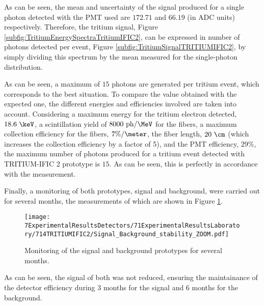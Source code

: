 As can be seen, the mean and uncertainty of the signal produced for a single photon detected with the PMT used are $172.71$ and $66.19$ (in ADC units) respectively. Therefore, the tritium signal, Figure \ref{subfig:TritiumEnergySpectraTritiumIFIC2}, can be expressed in number of photons detected per event, Figure \ref{subfig:TritiumSignalTRITIUMIFIC2}, by simply dividing this spectrum by the mean measured for the single-photon distribution.


As can be seen, a maximum of $15$ photons are generated per tritium event, which corresponds to the best situation. To compare the value obtained with the expected one, the different energies and efficiencies involved are taken into account. Considering a maximum energy for the tritium electron detected, $18.6~\keV$, a scintillation yield of $8000~\text{ph}/\MeV$ for the fibers, a maximum collection efficiency for the fibers, $7\%/\meter$, the fiber length, $20~\cm$ (which increases the collection efficiency by a factor of 5), and the PMT efficiency, $29\%$, the maximum number of photons produced for a tritium event detected with TRITIUM-IFIC 2 prototype is $15$. As can be seen, this is perfectly in accordance with the measurement.

Finally, a monitoring of both prototypes, signal and background, were carried out for several months, the measurements of which are shown in Figure \ref{fig:MonitorizationTRITIUMIFIC2}.

\begin{figure}[h]
\centering
\texttt{[image: 7ExperimentalResultsDetectors/71ExperimentalResultsLaboratory/714TRITIUMIFIC2/Signal\_Background\_stability\_ZOOM.pdf]}
\caption{Monitoring of the signal and background prototypes for several months.\label{fig:MonitorizationTRITIUMIFIC2}}
\end{figure}

As can be seen, the signal of both was not reduced, ensuring the maintainance of the detector efficiency during 3 months for the signal and 6 months for the background.







